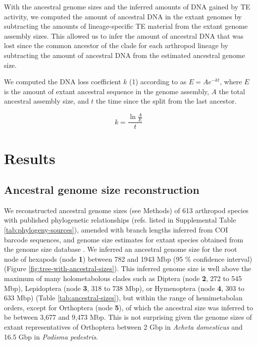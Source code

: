 With the ancestral genome sizes and the inferred amounts of DNA gained
by TE activity, we computed the amount of ancestral DNA in the extant
genomes by subtracting the amounts of lineage-specific TE material from
the extant genome assembly sizes. This allowed us to infer the amount of
ancestral DNA that was lost since the common ancestor of the clade for
each arthropod lineage by subtracting the amount of ancestral DNA from
the estimated ancestral genome size.

We computed the DNA loss coefficient \(k\) (1) according to
\citet{Lindblad-Toh2005} as \(E = A e^{-kt}\), where \(E\) is
the amount of extant ancestral sequence in the genome assembly,
\(A\) the total ancestral assembly size, and
\(t\) the time since the split from the last ancestor.

\begin{equation}
k = \frac{\ln{\frac{A}{E}}}{t}
\end{equation}

\section{Results}

\subsection*{Ancestral genome size
reconstruction}

We reconstructed ancestral genome sizes (see Methods) of 613 arthropod
species with published phylogenetic relationships (refs. listed in
Supplemental Table \ref{tab:phylogeny-sources}), amended with branch lengths inferred from COI
barcode sequences, and genome size estimates for extant species obtained
from the genome size database \citep{Gregory2018}. We inferred an
ancestral genome size for the root node of hexapods (node \textbf{1})
between 782 and 1943 Mbp (95 \% confidence interval) (Figure
\ref{fig:tree-with-ancestral-sizes}). This
inferred genome size is well above the maximum of many holometabolous
clades such as Diptera (node \textbf{2}, 272 to 545 Mbp), Lepidoptera
(node \textbf{3}, 318 to 738 Mbp), or Hymenoptera (node \textbf{4}, 303
to 633 Mbp) (Table \ref{tab:ancestral-sizes}), but within the range of hemimetabolan orders,
except for Orthoptera (node \textbf{5}), of which the ancestral size was
inferred to be between 3,677 and 9,473 Mbp. This is not surprising given
the genome sizes of extant representatives of Orthoptera between 2 Gbp
in \emph{Acheta domesticus} and 16.5 Gbp in \emph{Podisma pedestris}.

